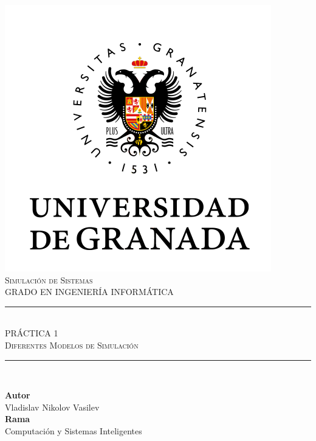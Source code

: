 \documentclass[11pt,a4paper]{report}
\newcommand{\asignatura}{Simulación de Sistemas}
\newcommand{\autor}{Vladislav Nikolov Vasilev}
\newcommand{\titulo}{PRÁCTICA 1}
\newcommand{\subtitulo}{Diferentes Modelos de Simulación}
\begin{document}

\begin{titlepage}

\begin{minipage}{\textwidth}

\centering

\includegraphics[scale=0.5]{img/ugr.png}\\

\textsc{\Large \asignatura{}\\[0.2cm]}
\textsc{GRADO EN INGENIERÍA INFORMÁTICA}\\[1cm]

\noindent\rule[-1ex]{\textwidth}{1pt}\\[1.5ex]
\textsc{{\Huge \titulo\\[0.5ex]}}
\textsc{{\Large \subtitulo\\}}
\noindent\rule[-1ex]{\textwidth}{2pt}\\[3.5ex]

\end{minipage}

\vspace{0.5cm}

\begin{minipage}{\textwidth}

\centering

\textbf{Autor}\\ {\autor{}}\\[2.5ex]
\textbf{Rama}\\ {Computación y Sistemas Inteligentes}\\[2.5ex]
\vspace{0.3cm}


\end{minipage}
\end{titlepage}
\end{document}
